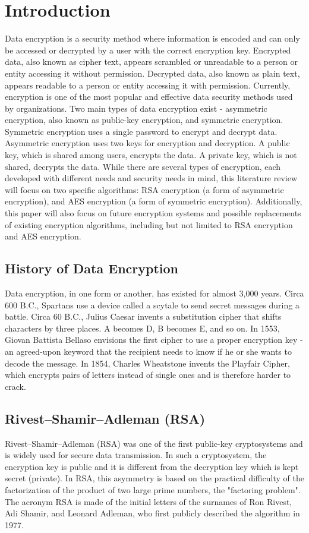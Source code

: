 \documentclass[journal]{IEEEtran}
\begin{document}
\section{\textbf{Introduction}}
Data encryption is a security method where information is encoded and can only be accessed or decrypted by a user with the correct encryption key. Encrypted data, also known as cipher text, appears scrambled or unreadable to a person or entity accessing it without permission. Decrypted data, also known as plain text, appears readable to a person or entity accessing it with permission. Currently, encryption is one of the most popular and effective data security methods used by organizations. Two main types of data encryption exist - asymmetric encryption, also known as public-key encryption, and symmetric encryption. Symmetric encryption uses a single password to encrypt and decrypt data. Asymmetric encryption uses two keys for encryption and decryption. A public key, which is shared among users, encrypts the data. A private key, which is not shared, decrypts the data. While there are several types of encryption, each developed with different needs and security needs in mind, this literature review will focus on two specific algorithms: RSA encryption (a form of asymmetric encryption), and AES encryption (a form of symmetric encryption). Additionally, this paper will also focus on future encryption systems and possible replacements of existing encryption algorithms, including but not limited to RSA encryption and AES encryption.

\subsection{\textbf{History of Data Encryption}}
Data encryption, in one form or another, has existed for almost 3,000 years. Circa 600 B.C., Spartans use a device called a scytale to send secret messages during a battle. Circa 60 B.C., Julius Caesar invents a substitution cipher that shifts characters by three places. A becomes D, B becomes E, and so on. In 1553, Giovan Battista Bellaso envisions the first cipher to use a proper encryption key - an agreed-upon keyword that the recipient needs to know if he or she wants to decode the message. In 1854, Charles Wheatstone invents the Playfair Cipher, which encrypts pairs of letters instead of single ones and is therefore harder to crack.

\subsection{\textbf{Rivest–Shamir–Adleman (RSA)}}
Rivest–Shamir–Adleman (RSA) was one of the first public-key cryptosystems and is widely used for secure data transmission. In such a cryptosystem, the encryption key is public and it is different from the decryption key which is kept secret (private). In RSA, this asymmetry is based on the practical difficulty of the factorization of the product of two large prime numbers, the "factoring problem". The acronym RSA is made of the initial letters of the surnames of Ron Rivest, Adi Shamir, and Leonard Adleman, who first publicly described the algorithm in 1977. 
\end{document}

